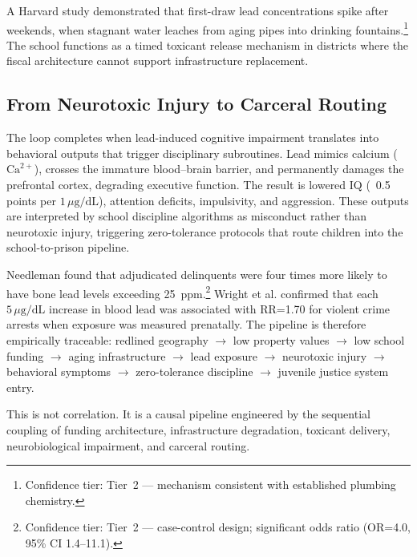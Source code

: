 A Harvard study demonstrated that first-draw lead concentrations spike
after weekends, when stagnant water leaches from aging pipes into drinking
fountains.\footnote{Confidence tier: Tier~2 --- mechanism consistent with
established plumbing chemistry.} The school functions as a timed toxicant release
mechanism in districts where the fiscal architecture cannot support
infrastructure replacement.

\subsection{From Neurotoxic Injury to Carceral Routing}

The loop completes when lead-induced cognitive impairment translates into
behavioral outputs that trigger disciplinary subroutines. Lead mimics calcium
($\mathrm{Ca}^{2+}$), crosses the immature blood--brain barrier, and permanently
damages the prefrontal cortex, degrading executive function. The result is
lowered IQ (~0.5 points per $1\,\mu\mathrm{g}/\mathrm{dL}$), attention deficits,
impulsivity, and aggression. These outputs are interpreted by school discipline
algorithms as misconduct rather than neurotoxic injury, triggering zero-tolerance
protocols that route children into the school-to-prison pipeline.

Needleman found that adjudicated delinquents were four times more likely to
have bone lead levels exceeding 25~ppm.\footnote{Confidence tier: Tier~2 --- case-control design;
significant odds ratio (OR=4.0, 95\% CI 1.4--11.1).} Wright et al. confirmed
that each $5\,\mu\mathrm{g}/\mathrm{dL}$ increase in blood lead was associated
with RR=1.70 for violent crime arrests when exposure was measured prenatally.
The pipeline is therefore empirically traceable: redlined geography
$\rightarrow$ low property values $\rightarrow$ low school funding
$\rightarrow$ aging infrastructure $\rightarrow$ lead exposure
$\rightarrow$ neurotoxic injury $\rightarrow$ behavioral symptoms
$\rightarrow$ zero-tolerance discipline $\rightarrow$ juvenile justice system
entry.

This is not correlation. It is a causal pipeline engineered by the sequential
coupling of funding architecture, infrastructure degradation, toxicant delivery,
neurobiological impairment, and carceral routing.

